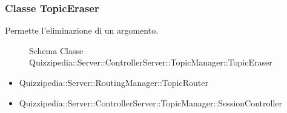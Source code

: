 \subsubsection{Classe TopicEraser}
Permette l'eliminazione di un argomento.
\begin{figure}[H]
\centering
\noindent{}
\caption[Schema Classe TopicEraser]{Schema Classe Quizzipedia::Server::ControllerServer::TopicManager::TopicEraser}
\end{figure}
\begin{itemize}
\item Quizzipedia::Server::RoutingManager::TopicRouter
\end{itemize}
\begin{itemize}
\item Quizzipedia::Server::ControllerServer::TopicManager::SessionController
\end{itemize}
